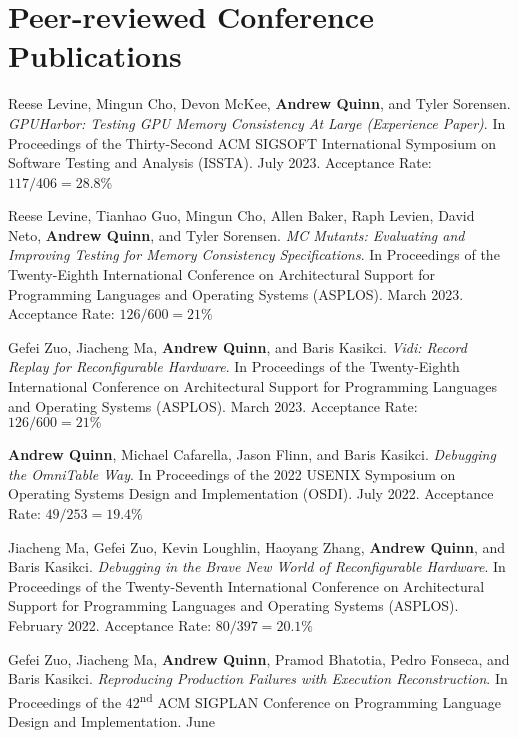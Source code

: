 \documentclass[letterpaper,10pt]{article}
\newcommand{\paper}[3]{#1. #2 #3}
\begin{document}
\section{Peer-reviewed Conference Publications}
\begin{smenumerate}
\item \paper{Reese Levine, Mingun Cho, Devon McKee, \textbf{Andrew Quinn}, and
  Tyler Sorensen}{\emph{GPUHarbor: Testing GPU Memory Consistency At Large
  (Experience Paper)}.  In Proceedings of the Thirty-Second ACM SIGSOFT
  International Symposium on Software Testing and Analysis (ISSTA). July
  2023.}{Acceptance Rate: $117/406=28.8\%$}\
  \item \paper{Reese Levine, Tianhao Guo, Mingun Cho, Allen Baker, Raph Levien,
    David Neto, \textbf{Andrew Quinn}, and Tyler Sorensen}{\emph{MC Mutants:
    Evaluating and Improving Testing for Memory Consistency Specifications}. In
    Proceedings of the Twenty-Eighth International Conference on Architectural
    Support for Programming Languages and Operating Systems (ASPLOS). March
    2023.}{Acceptance Rate: $126/600=21\%$}
  \item \paper{Gefei Zuo, Jiacheng Ma, \textbf{Andrew Quinn}, and Baris
    Kasikci}{\emph{Vidi: Record Replay for Reconfigurable Hardware}. In
    Proceedings of the Twenty-Eighth International Conference on Architectural
    Support for Programming Languages and Operating Systems (ASPLOS). March
    2023.}{Acceptance Rate: $126/600=21\%$}
  \item \paper{\textbf{Andrew Quinn}, Michael Cafarella, Jason Flinn, and Baris
    Kasikci}{\emph{Debugging the OmniTable Way}.  In Proceedings of the 2022
    USENIX Symposium on Operating Systems Design and Implementation (OSDI).
    July 2022.}{Acceptance Rate: $49/253=19.4\%$}
  \item \paper{Jiacheng Ma, Gefei Zuo, Kevin Loughlin, Haoyang Zhang,
    \textbf{Andrew Quinn}, and Baris Kasikci}{\emph{Debugging in the Brave New
    World of Reconfigurable Hardware}. In Proceedings of the Twenty-Seventh
    International Conference on Architectural Support for Programming Languages
    and Operating Systems (ASPLOS). February 2022.}{Acceptance Rate:
    $80/397=20.1\%$}
  \item \paper{Gefei Zuo, Jiacheng Ma, \textbf{Andrew Quinn}, Pramod
    Bhatotia, Pedro Fonseca, and Baris Kasikci}{\emph{Reproducing
    Production Failures with Execution Reconstruction}. In Proceedings
    of the 42\textsuperscript{nd} ACM SIGPLAN Conference on
    Programming Language Design and Implementation. June
}
\end{smenumerate}
\end{document}
